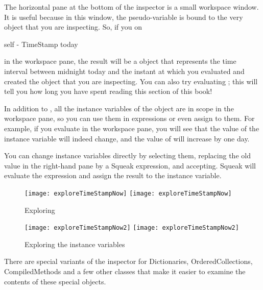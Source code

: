 \documentclass[a4paper,10pt,twoside]{book}
\begin{document}
The horizontal pane at the bottom of the inspector is a small workspace window.  It is useful because in this window, the pseudo-variable  is bound to the very object that you are inspecting.  
So, if you  on
\begin{code}{}
self - TimeStamp today
\end{code}
in the workspace pane, the result will be a  object that represents the time interval between midnight today and the instant at which you evaluated   and created the  object that you are inspecting.
You can also try evaluating ; this will tell you how long you have spent reading this section of this book!

In addition to , all the instance variables of the object are in scope in the workspace pane, so you can use them in expressions or even assign to them.  For example, if you evaluate  in the workspace pane, you will see that the value of the  instance variable will indeed change, and the value of  will increase by one day.

You can change instance variables directly by selecting them, replacing the old value in the right-hand  pane by a Squeak expression, and accepting.  
Squeak will evaluate the expression and assign the result to the instance variable.

\begin{figure}[tbp]
\begin{minipage}{0.48\textwidth}
	\begin{center}
	\ifluluelse
		{\texttt{[image: exploreTimeStampNow]}}
		{\texttt{[image: exploreTimeStampNow]}}
	\end{center}
	\caption{Exploring }
	\label{fig:exploreTimeStampNow}
\end{minipage}
\hfill
\begin{minipage}{0.48\textwidth}
	\begin{center}
	\ifluluelse
		{\texttt{[image: exploreTimeStampNow2]}}
		{\texttt{[image: exploreTimeStampNow2]}}
	\end{center}
	\caption{Exploring the instance variables}
	\label{fig:exploreTimeStampNow2}
\end{minipage}
\end{figure}

There are special variants of the inspector for Dictionaries, OrderedCollections, CompiledMethods and a few other classes that make it easier to examine the contents of these special objects.
\end{document}
